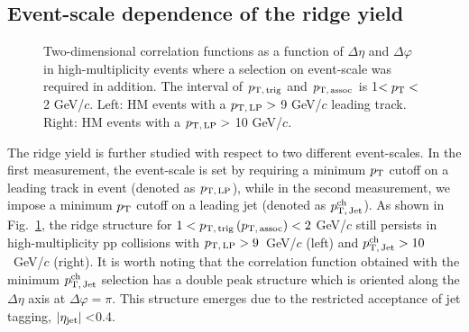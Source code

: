\subsection{Event-scale dependence of the ridge yield}
\begin{figure}[h!]
	\centering
	\caption{ Two-dimensional correlation functions as a function of $\Delta\eta$ and $\Delta\varphi$ in high-multiplicity events where a selection on event-scale was required in addition. The interval of $p_\mathrm{T,\,trig}$ and $p_\mathrm{T,\,assoc}$ is 1$<p_\mathrm{T}<$2 GeV/$c$. Left: HM events with a $p_\mathrm{T,\,LP}>$ 9 GeV/$c$ leading track. Right: HM events with a $p_\mathrm{T,\,LP}>$ 10 GeV/$c$.}
	\label{fig:PlotCorrHMTSel}
\end{figure}

The ridge yield is further studied with respect to two different event-scales. In the first measurement, the event-scale is set by requiring a minimum $p_\mathrm{T}$ cutoff on a leading track in event (denoted as $p_\mathrm{T,\,LP}$), while in the second measurement, we impose a minimum $p_\mathrm{T}$ cutoff on a leading jet (denoted as $p_\mathrm{T,\,Jet}^\mathrm{ch}$). As shown in Fig.~\ref{fig:PlotCorrHMTSel}, the ridge structure for $1< p_\mathrm{T,\,trig}\,(p_\mathrm{T,\,assoc}) <2$ GeV/$c$ still persists in high-multiplicity pp collisions with $p_\mathrm{T,\,LP}>9$~GeV/$c$ (left) and $p_\mathrm{T,\,Jet}^\mathrm{ch}>10$~GeV/$c$ (right).  %
It is worth noting that the correlation function obtained with the minimum $p_\mathrm{T,\,Jet}^\mathrm{ch}$ selection has a double peak structure which is oriented along the $\Delta\eta$ axis at $\Delta\varphi=\pi$. This structure emerges due to the restricted acceptance of jet tagging, $|\eta_{\rm{jet}}|<$0.4.

